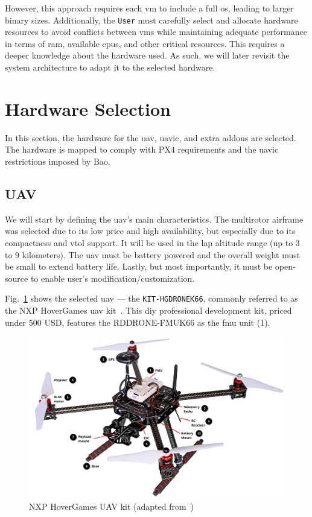 However, this approach requires each \gls{vm} to include a full \gls{os},
leading to larger binary sizes. Additionally, the \texttt{User} must carefully
select and allocate hardware resources to avoid conflicts between \glspl{vm}
while maintaining adequate performance in terms of \gls{ram}, available
\glspl{cpu}, and other critical resources. This requires a deeper knowledge
about the hardware used. As such, we will later revisit the system architecture
to adapt it to the selected hardware.

\section{Hardware Selection}
\label{sec:hardware-selection}
In this section, the hardware for the \gls{uav}, \gls{uavic}, and
extra addons are selected. The hardware is mapped to comply with PX4
requirements and the \gls{uavic} restrictions imposed by Bao.

\subsection{UAV}
\label{sec:uav-hw-sel}
We will start by defining the \gls{uav}'s main characteristics. The multirotor
airframe was selected due to its low price and high availability, but especially
due to its compactness and \gls{vtol} support. It will be used in the \gls{lap}
altitude range (up to 3 to 9 kilometers). The \gls{uav} must be battery powered
and the overall weight must be small to extend battery life. Lastly, but most
importantly, it must be open-source to enable user's modification/customization. 

Fig.~\ref{fig:hoverGames-drone} shows the selected \gls{uav} --- the
\texttt{KIT-HGDRONEK66}, commonly referred to as the NXP HoverGames \gls{uav}
kit~\cite{nxp-hoverGames-uav}. This \gls{diy} professional development kit, priced under
500 USD, features the RDDRONE-FMUK66 as the \gls{fmu} unit (1).

\begin{figure}[!hbt]
  \centering
  \includegraphics[width=1.0\textwidth]{./img/pdf/hoverGames-drone.pdf} 
  \caption[NXP HoverGames UAV kit]{NXP HoverGames UAV kit (adapted from~\cite{nxp-hoverGames-uav})\footnotemark}%
  \label{fig:hoverGames-drone}
\end{figure}
%

